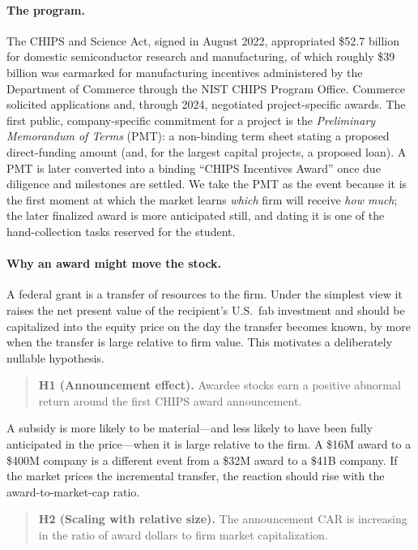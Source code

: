 \documentclass[12pt]{article}
\begin{document}
\paragraph{The program.} The CHIPS and Science Act, signed in August 2022, appropriated
\$52.7 billion for domestic semiconductor research and manufacturing, of which roughly
\$39 billion was earmarked for manufacturing incentives administered by the Department of
Commerce through the NIST CHIPS Program Office. Commerce solicited applications and, through
2024, negotiated project-specific awards. The first public, company-specific commitment for a
project is the \emph{Preliminary Memorandum of Terms} (PMT): a non-binding term sheet stating a
proposed direct-funding amount (and, for the largest capital projects, a proposed loan). A PMT is
later converted into a binding ``CHIPS Incentives Award'' once due diligence and milestones are
settled. We take the PMT as the event because it is the first moment at which the market learns
\emph{which} firm will receive \emph{how much}; the later finalized award is more anticipated
still, and dating it is one of the hand-collection tasks reserved for the student.

\paragraph{Why an award might move the stock.} A federal grant is a transfer of resources to the
firm. Under the simplest view it raises the net present value of the recipient's U.S.\ fab
investment and should be capitalized into the equity price on the day the transfer becomes known,
by more when the transfer is large relative to firm value. This motivates a deliberately nullable
hypothesis.
\begin{quote}
\textbf{H1 (Announcement effect).} Awardee stocks earn a positive abnormal return around the
first CHIPS award announcement.
\end{quote}
A subsidy is more likely to be material---and less likely to have been fully anticipated in the
price---when it is large relative to the firm. A \$16M award to a \$400M company is a different
event from a \$32M award to a \$41B company. If the market prices the incremental transfer, the
reaction should rise with the award-to-market-cap ratio.
\begin{quote}
\textbf{H2 (Scaling with relative size).} The announcement CAR is increasing in the ratio of
award dollars to firm market capitalization.
\end{quote}
\end{document}
